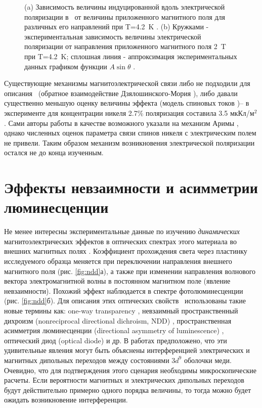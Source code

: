 \begin{figure}[ht]
	\caption{(a) Зависимость величины индуцированной вдоль  электрической поляризации в \ncbo\ от величины приложенного магнитного поля для различных его направлений при T=\SI{4.2}{\kelvin} \cite{Nenert2007}. (b) Кружками - экспериментальная зависимость величины электрической поляризации от направления приложенного магнитного поля \SI{2}{\tesla} при T=\SI{4.2}{\kelvin}; сплошная линия - аппроксимация экспериментальных данных графиком функции $A\sin\theta$ \cite{Nenert2007}.}
	\label{fig:khan}
\end{figure} 

Существующие механизмы магнитоэлектрической связи либо не подходили для описания \cbo\ (обратное взаимодействие Дзялошинского-Мория \cite{Sergienko2006}), либо давали существенно меньшую оценку величины эффекта (модель спиновых токов \cite{Katsura2005})– в эксперименте для концентрации никеля 2.7\% поляризация составила 3.5 мкКл/м\(^2\). Сами авторы работы \cite{Khanh2013} в качестве возможного указали на механизм Аримы \cite{Arima2007}, однако численных оценок параметра связи спинов никеля с электрическим полем не привели. Таким образом механизм возникновения электрической поляризации остался не до конца изученным.

\section{Эффекты невзаимности и асимметрии люминесценции}\label{sec:ch1/sec3}

Не менее интересны экспериментальные данные по изучению \emph{динамических} магнитоэлектрических эффектов в оптических спектрах этого материала во внешних магнитных полях \cite{Saito2008prl, Saito2008jpsj, Lovesey2009, Toyoda2015, Boldyrev2015}. Коэффициент прохождения света через пластинку исследуемого образца меняется при переключении направления внешнего магнитного поля (рис. \cref{fig:ndd}а), а также при изменении направления волнового вектора электромагнитной волны в постоянном магнитном поле (явление невзаимности). Похожий эффект наблюдается в спектре фотолюминесценции (рис. \cref{fig:ndd}б). Для описания этих оптических свойств \cbo\ использованы такие новые термины как: one-way transparency \cite{Toyoda2015}, невзаимный пространственный дихроизм (nonreciprocal directional dichroism, NDD) \cite{Toyoda2015}, пространственная асимметрия люминесценции (directional asymmetry of luminescence) \cite{Toyoda2016}, оптический диод (optical diode) и др. В работах \cite{Toyoda2015, Toyoda2016} предположено, что эти удивительные явления могут быть объяснены интерференцией электрических и магнитных дипольных переходов между состояниями \(3d^9\) оболочки меди. Очевидно, что для подтверждения этого сценария необходимы микроскопические расчеты. Если вероятности магнитных и электрических дипольных переходов будут действительно примерно одного порядка величины, то тогда можно будет ожидать возникновение интерференции.


